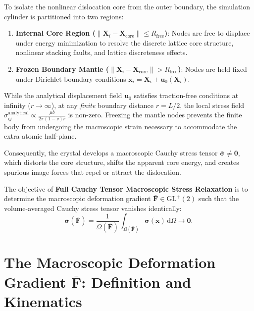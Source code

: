 \documentclass[11pt,a4paper]{article}
\begin{document}
To isolate the nonlinear dislocation core from the outer boundary, the simulation cylinder is partitioned into two regions:
\begin{enumerate}
    \item \textbf{Internal Core Region ($\|\mathbf{X}_i - \mathbf{X}_{\text{core}}\| \le R_{\text{free}}$)}: 
    Nodes are free to displace under energy minimization to resolve the discrete lattice core structure, nonlinear stacking faults, and lattice discreteness effects.
    \item \textbf{Frozen Boundary Mantle ($\|\mathbf{X}_i - \mathbf{X}_{\text{core}}\| > R_{\text{free}}$)}: 
    Nodes are held fixed under Dirichlet boundary conditions $\mathbf{x}_i = \mathbf{X}_i + \mathbf{u}_0(\mathbf{X}_i)$.
\end{enumerate}

\begin{infobox}
While the analytical displacement field $\mathbf{u}_0$ satisfies traction-free conditions at infinity ($r \to \infty$), at any \emph{finite} boundary distance $r = L/2$, the local stress field $\sigma_{ij}^{\text{analytical}} \propto \frac{\mu b}{2\pi(1-\nu)r}$ is non-zero. Freezing the mantle nodes prevents the finite body from undergoing the macroscopic strain necessary to accommodate the extra atomic half-plane. 

Consequently, the crystal develops a macroscopic Cauchy stress tensor $\bar{\boldsymbol{\sigma}} \ne \mathbf{0}$, which distorts the core structure, shifts the apparent core energy, and creates spurious image forces that repel or attract the dislocation.
\end{infobox}

The objective of \textbf{Full Cauchy Tensor Macroscopic Stress Relaxation} is to determine the macroscopic deformation gradient $\bar{\mathbf{F}} \in \mathrm{GL}^+(2)$ such that the volume-averaged Cauchy stress tensor vanishes identically:
\begin{equation}
\bar{\boldsymbol{\sigma}}(\bar{\mathbf{F}}) = \frac{1}{\Omega(\bar{\mathbf{F}})} \int_{\Omega(\bar{\mathbf{F}})} \boldsymbol{\sigma}(\mathbf{x}) \, \mathrm{d}\Omega \longrightarrow \mathbf{0}.
\end{equation}

\section{The Macroscopic Deformation Gradient \texorpdfstring{$\bar{\mathbf{F}}$}{F\_bar}: Definition and Kinematics}
\end{document}
